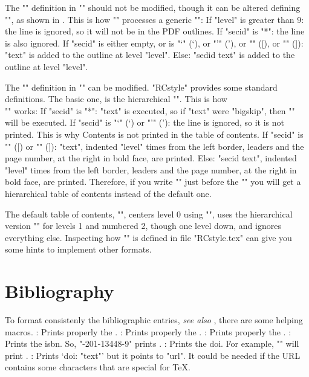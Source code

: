 The "\tocline" definition in "\files"
should not be modified, though it can be altered
defining "\doextrapdf", as shown in .
This is how "\files" processes a generic
"":
\beginpoints
\point If "level" is greater than 9: the line is ignored, so it will not be
 in the PDF outlines.
\point If "secid" is "*": the line is also ignored.
\point If "secid" is either empty,
 or is "\lq" (`), or  "\rq" ('), or "\lbrack" ([), or "\lbrack" (]):
 "text" is added to the outline at level "level".
\point Else: "sedid text" is added to the outline at level "level".
\endpoints

The "\tocline" definition in "\maketoc" can be modified.
"RCstyle" provides some standard definitions.
The basic one, is the hierarchical "\toclineX". This is how\\
"" works:
\beginpoints
\point If "secid" is "*": "\csname text\endcsname" is executed,
 so if "text" were "bigskip", then "\bigskip" will be executed.
\point If "secid" is "\lq" (`) or "\rq" ('): the line is ignored,
 so it is not printed.
 This is why Contents is not printed in the table of contents.
\point If "secid" is "\lbrack" ([) or "\rbrack" (]):
 "text", indented "level" times from the left border,
 leaders and the page number, at the right in bold face, are printed.
\point Else: "secid text", indented "level" times from the left border,
 leaders and the page number, at the right in bold face, are printed.
\endpoints
Therefore, if you write "\let\tocline=\toclineX" just before the
"\maketoc" you will get a hierarchical table of contents
instead of the default one.

The default table of contents, "\toclineR",
centers level 0 using "\toclineC",
uses the hierarchical version "\toclineX" for levels 1 and numbered 2,
though one level down,
and ignores everything else.
Inspecting how "\toclineR" is defined in file "RCstyle.tex"
can give you some hints to implement other formats.


\section{Bibliography}

To format consistenly the bibliographic entries,
{\em see also} ,
there are some helping macros.
\command{}: Prints properly the .
\command{}: Prints properly the .
\command{}: Prints properly the .
\command\ISBN: Prints the {\sc isbn}. So,
 "-201-13448-9" prints .
\command{}: Prints the {\sc doi}. For example,
 "" will print
  .
\command{}: Prints ‘{\sc doi}: "text"’
 but it points to "url". It could be needed if the
 URL contains some characters that are special for {\TeX}.


